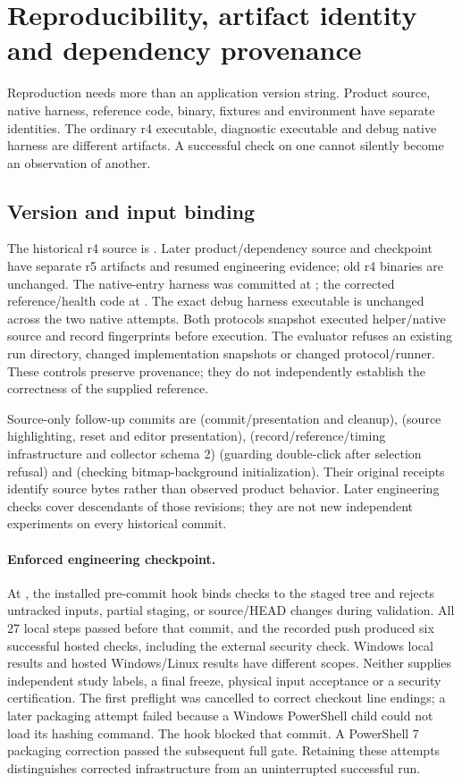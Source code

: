 \section{Reproducibility, artifact identity and dependency provenance}
Reproduction needs more than an application version string. Product source,
native harness, reference code, binary, fixtures and environment have separate
identities. The ordinary r4 executable, diagnostic executable and debug native
harness are different artifacts. A successful check on one cannot silently
become an observation of another.

\subsection{Version and input binding}
The historical r4 source is . Later product/dependency source
 and checkpoint  have separate r5 artifacts and
resumed engineering evidence; old r4 binaries are unchanged. The native-entry harness was
committed at ; the corrected reference/health code at
. The exact debug harness executable is unchanged across the two
native attempts. Both protocols snapshot executed helper/native source and
record fingerprints before execution. The evaluator refuses an existing run
directory, changed implementation snapshots or changed protocol/runner.
These controls preserve provenance; they do not independently establish the
correctness of the supplied reference.

Source-only follow-up commits are  (commit/presentation and
cleanup),  (source highlighting, reset and editor presentation),
 (record/reference/timing infrastructure and collector schema 2)
 (guarding double-click after selection refusal) and
 (checking bitmap-background initialization). Their original
receipts identify source bytes rather than observed product behavior. Later
engineering checks cover descendants of those revisions; they are not new
independent experiments on every historical commit.

\paragraph{Enforced engineering checkpoint.}
At , the installed pre-commit hook binds checks to the staged
tree and rejects untracked inputs, partial staging, or source/HEAD changes
during validation. All 27 local steps passed before that commit, and the
recorded push produced six successful hosted checks, including the external
security check. Windows local results and hosted Windows/Linux results have
different scopes. Neither supplies independent study labels, a final freeze,
physical input acceptance or a security certification. The first preflight
was cancelled to correct checkout line endings; a later packaging attempt
failed because a Windows PowerShell child could not load its hashing command.
The hook blocked that commit. A PowerShell 7 packaging correction passed the
subsequent full gate. Retaining these attempts distinguishes corrected
infrastructure from an uninterrupted successful run.

